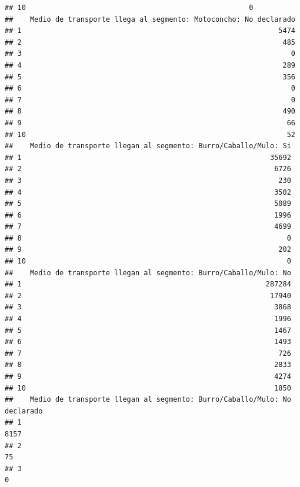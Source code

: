 \documentclass[11pt,]{article}
\begin{document}
\begin{verbatim}
## 10                                                     0
##    Medio de transporte llega al segmento: Motoconcho: No declarado
## 1                                                             5474
## 2                                                              485
## 3                                                                0
## 4                                                              289
## 5                                                              356
## 6                                                                0
## 7                                                                0
## 8                                                              490
## 9                                                               66
## 10                                                              52
##    Medio de transporte llegan al segmento: Burro/Caballo/Mulo: Si
## 1                                                           35692
## 2                                                            6726
## 3                                                             230
## 4                                                            3502
## 5                                                            5089
## 6                                                            1996
## 7                                                            4699
## 8                                                               0
## 9                                                             202
## 10                                                              0
##    Medio de transporte llegan al segmento: Burro/Caballo/Mulo: No
## 1                                                          287284
## 2                                                           17940
## 3                                                            3868
## 4                                                            1996
## 5                                                            1467
## 6                                                            1493
## 7                                                             726
## 8                                                            2833
## 9                                                            4274
## 10                                                           1850
##    Medio de transporte llegan al segmento: Burro/Caballo/Mulo: No declarado
## 1                                                                      8157
## 2                                                                        75
## 3                                                                         0

\end{verbatim}
\end{document}
